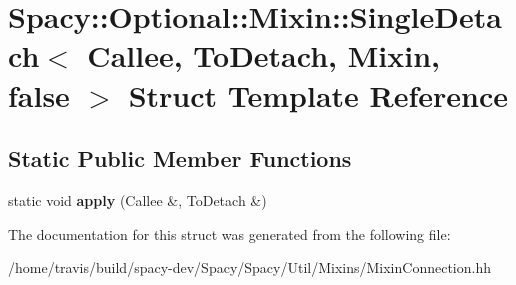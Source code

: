 \hypertarget{structSpacy_1_1Optional_1_1Mixin_1_1SingleDetach_3_01Callee_00_01ToDetach_00_01Mixin_00_01false_01_4}{\section{Spacy\-:\-:Optional\-:\-:Mixin\-:\-:Single\-Detach$<$ Callee, To\-Detach, Mixin, false $>$ Struct Template Reference}
\label{structSpacy_1_1Optional_1_1Mixin_1_1SingleDetach_3_01Callee_00_01ToDetach_00_01Mixin_00_01false_01_4}
}
\subsection*{Static Public Member Functions}
\begin{DoxyCompactItemize}
\item 
\hypertarget{structSpacy_1_1Optional_1_1Mixin_1_1SingleDetach_3_01Callee_00_01ToDetach_00_01Mixin_00_01false_01_4_ad1d0c04f703bf7236b59ffccdd001cb1}{static void {\bfseries apply} (Callee \&, To\-Detach \&)}\label{structSpacy_1_1Optional_1_1Mixin_1_1SingleDetach_3_01Callee_00_01ToDetach_00_01Mixin_00_01false_01_4_ad1d0c04f703bf7236b59ffccdd001cb1}

\end{DoxyCompactItemize}


The documentation for this struct was generated from the following file\-:\begin{DoxyCompactItemize}
\item 
/home/travis/build/spacy-\/dev/\-Spacy/\-Spacy/\-Util/\-Mixins/Mixin\-Connection.\-hh\end{DoxyCompactItemize}
